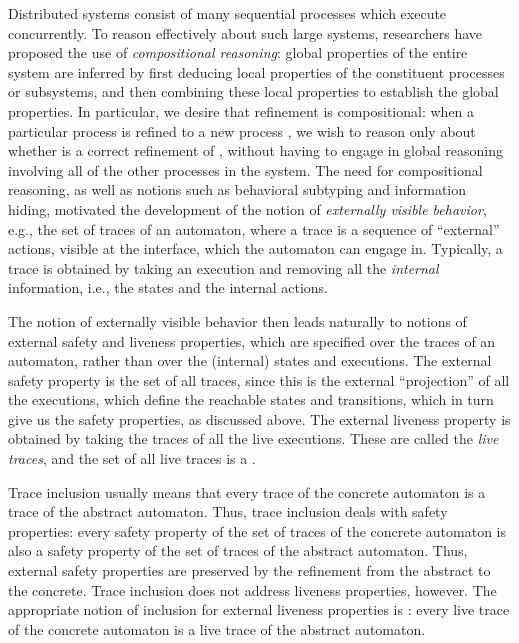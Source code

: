 \documentclass[11pt]{article}
\begin{document}
Distributed systems consist of many sequential processes which execute
concurrently. To reason effectively about such large systems,
researchers have proposed the use of \emph{compositional reasoning}:
global properties of the entire system are inferred by first
deducing local properties of the constituent processes or subsystems, and then
combining these local properties to establish the global properties.
In particular, we desire that refinement is compositional: when a
particular process  is refined to a new process , we wish
to reason only about whether  is a correct refinement of ,
without having to engage in global reasoning involving all of the
other processes in the system. The need for compositional reasoning,
as well as notions such as behavioral subtyping \cite{LW94} and
information hiding, motivated the development of the notion of
\emph{externally visible behavior}, e.g., the set of traces of an
automaton, where a trace is a sequence of ``external'' actions,
visible at the interface, which the automaton can engage in.
Typically, a trace is obtained by taking an execution and removing all
the \emph{internal} information, i.e., the states and the internal actions.

The notion of externally visible behavior then leads naturally to
notions of external safety and liveness properties, which are
specified over the traces of an automaton, rather than over the
(internal) states and executions.
The external safety property is the set of all traces,
since this is the external ``projection'' of all the executions, which
define the reachable states and transitions, which in turn give us the
safety properties, as discussed above.
The external liveness property is obtained by taking the 
traces of all the live executions. These are called the \emph{live
traces}, and the set of all live traces is a . 




Trace inclusion usually means that every trace of the concrete
automaton is a trace of the abstract automaton.  Thus, trace inclusion
deals with safety properties: every safety property of the set of
traces of the concrete automaton is also a safety property of the set
of traces of the abstract automaton. Thus, external
safety properties are preserved by the refinement from the abstract to
the concrete.  Trace inclusion does not address liveness properties,
however.
The appropriate notion of inclusion for external liveness properties is
 \cite{GSSL93,GSSL98}: every live trace of the
concrete automaton is a live trace of the abstract automaton.
\end{document}

